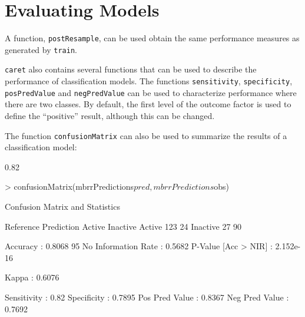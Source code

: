 \documentclass[12pt]{article}
\begin{document}
\section{Evaluating Models}

A function, \texttt{postResample}, can be used obtain the same performance measures as generated by \texttt{train}. 

\texttt{caret} also contains several functions that can be used to describe the performance of classification models. The functions \texttt{sensitivity}, \texttt{specificity}, \texttt{posPredValue} and \texttt{negPredValue} can be used to characterize performance where there are two classes. By default, the first level of the outcome factor is used to define the ``positive'' result, although this can be changed. 

The function \texttt{confusionMatrix} can also be used to summarize the results of a classification model:

\begin{small}
\begin{Schunk}
\begin{Soutput}
[1] 0.82
\end{Soutput}
\begin{Sinput}
> confusionMatrix(mbrrPredictions$pred, mbrrPredictions$obs)
\end{Sinput}
\begin{Soutput}
Confusion Matrix and Statistics

          Reference
Prediction Active Inactive
  Active      123       24
  Inactive     27       90
                                      
            Accuracy : 0.8068         
              95% CI : (0.754, 0.8526)
 No Information Rate : 0.5682         
 P-Value [Acc > NIR] : 2.152e-16      
                                      
               Kappa : 0.6076         
                                      
         Sensitivity : 0.82           
         Specificity : 0.7895         
      Pos Pred Value : 0.8367         
      Neg Pred Value : 0.7692         
\end{Soutput}
\end{Schunk}
\end{small}
\end{document}
